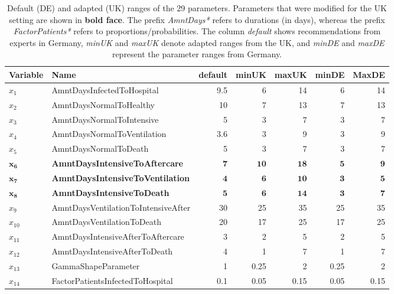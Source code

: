 \documentclass[conference]{IEEEtran}
\begin{document}
\begin{table}[ht]\label{tab:para}
\caption{Default (DE) and adapted (UK) ranges of the 29 parameters. Parameters that were  modified for the UK setting are shown in \textbf{bold face}. The prefix \emph{AmntDays*}\/ refers to durations (in days), whereas the prefix \emph{FactorPatients*}\/ refers to proportions/probabilities. The column \emph{default} shows recommendations from experts in Germany, \emph{minUK} and \emph{maxUK} denote adapted ranges from the UK, and \emph{minDE} and \emph{maxDE} represent the parameter ranges from Germany.}  
\centering
\begin{tabular}{llrrrrr}
  \hline
Variable & Name & default & minUK & maxUK & minDE & MaxDE \\ 
  \hline
$x_1$&  AmntDaysInfectedToHospital & 9.5 &   6 &  14 &   6 &  14 \\
$x_2$&   AmntDaysNormalToHealthy&  10 &   7 &  13 &   7 &  13 \\
$x_3$&   AmntDaysNormalToIntensive &   5 &   3 &   7 &   3 &   7 \\ 
$x_4$&  AmntDaysNormalToVentilation & 3.6 &   3 &   9 &   3 &   9 \\ 
$x_5$&   AmntDaysNormalToDeath&   5 &   3 &   7 &   3 &   7 \\  
$ \mathbf{x_6}$&   \textbf{AmntDaysIntensiveToAftercare} & $\mathbf{7}$ & $\mathbf{10}$ & $\mathbf{18}$ & $\mathbf{5}$ & $\mathbf{9}$ \\ 
$\mathbf{x_7}$ &   \textbf{AmntDaysIntensiveToVentilation} & $\mathbf{4}$ & $\mathbf{6}$ & $\mathbf{10}$ & $\mathbf{3}$ & $\mathbf{5}$ \\ 
$\mathbf{x_8}$&   \textbf{AmntDaysIntensiveToDeath} & $\mathbf{5}$ & $\mathbf{6}$ & $\mathbf{14}$ & $\mathbf{3}$  & $\mathbf{7}$ \\ 
$x_9$&   AmntDaysVentilationToIntensiveAfter &  30 &  25 &  35 &  25 &  35 \\ 
$x_{10}$&   AmntDaysVentilationToDeath  &  20 &  17 &  25 &  17 &  25 \\  
$x_{11}$&   AmntDaysIntensiveAfterToAftercare &   3 &   2 &   5 &   2 &   5 \\ 
$x_{12}$&   AmntDaysIntensiveAfterToDeath &   4 &   1 &   7 &   1 &   7 \\ 
$x_{13}$&   GammaShapeParameter &   1 & 0.25 &   2 & 0.25 &   2 \\ 
$x_{14}$&   FactorPatientsInfectedToHospital & 0.1 & 0.05 & 0.15 & 0.05 & 0.15 \\ 

\end{tabular}
\end{table}
\end{document}
